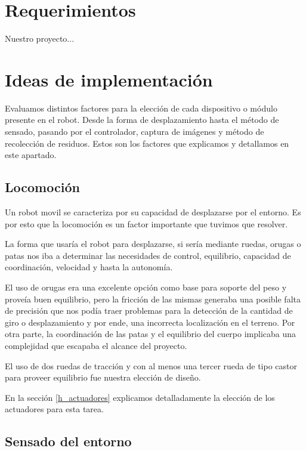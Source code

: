 \section{Requerimientos}
\label{h_requerimientos}

Nuestro proyecto...


\section{Ideas de implementaci\'on}
\label{h_ideas}

Evaluamos distintos factores para la elecci\'on de cada dispositivo o m\'odulo presente en el robot.
Desde la forma de desplazamiento hasta el m\'etodo de sensado, pasando por el controlador, captura
de im\'agenes y m\'etodo de recolecci\'on de residuos.
Estos son los factores que explicamos y detallamos en este apartado.

\subsection{Locomoci\'on}
\label{h_ideas_locomocion}

Un robot movil se caracteriza por su capacidad de desplazarse por el entorno.
Es por esto que la locomoci\'on es un factor importante que tuvimos que resolver.

La forma que usar\'ia el robot para desplazarse, si ser\'ia mediante ruedas, orugas o patas nos
iba a determinar las necesidades de control, equilibrio, capacidad de coordinaci\'on, velocidad
y hasta la autonom\'ia.

El uso de orugas era una excelente opci\'on como base para soporte del peso y prove\'ia buen
equilibrio, pero la fricci\'on de las mismas generaba una posible falta de precisi\'on que nos
pod\'ia traer problemas para la detecci\'on de la cantidad de giro o desplazamiento y por ende,
una incorrecta localizaci\'on en el terreno.
Por otra parte, la coordinaci\'on de las patas y el equilibrio del cuerpo implicaba una
complejidad que escapaba el alcance del proyecto.

El uso de dos ruedas de tracci\'on y con al menos una tercer rueda de tipo castor para proveer
equilibrio fue nuestra elecci\'on de dise\~no.

En la secci\'on \ref{h_actuadores} explicamos detalladamente la elecci\'on de los actuadores
para esta tarea.

\subsection{Sensado del entorno}
\label{h_ideas_sensado}


